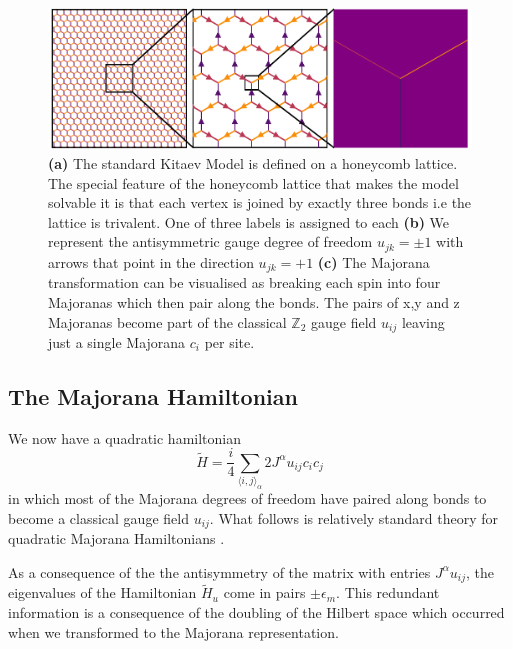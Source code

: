 \begin{figure}
\hypertarget{fig:intro_figure_template}{%
\centering
\includegraphics[width=1\textwidth,height=\textheight]{figure_code/amk_chapter/honeycomb_zoom/intro_figure_template.pdf}
\caption{\textbf{(a)} The standard Kitaev Model is defined on a honeycomb lattice. The special feature of the honeycomb lattice that makes the model solvable it is that each vertex is joined by exactly three bonds i.e the lattice is trivalent. One of three labels is assigned to each \textbf{(b)} We represent the antisymmetric gauge degree of freedom \(u_{jk} = \pm 1\) with arrows that point in the direction \(u_{jk} = +1\) \textbf{(c)} The Majorana transformation can be visualised as breaking each spin into four Majoranas which then pair along the bonds. The pairs of x,y and z Majoranas become part of the classical \(\mathbb{Z}_2\) gauge field \(u_{ij}\) leaving just a single Majorana \(c_i\) per site.}\label{fig:intro_figure_template}
}
\end{figure}

\hypertarget{the-majorana-hamiltonian}{%
\subsection{The Majorana Hamiltonian}\label{the-majorana-hamiltonian}}

We now have a quadratic hamiltonian \[ \tilde{H} =  \frac{i}{4} \sum_{\langle i,j\rangle_\alpha} 2J^{\alpha} u_{ij} c_i c_j\] in which most of the Majorana degrees of freedom have paired along bonds to become a classical gauge field \(u_{ij}\). What follows is relatively standard theory for quadratic Majorana Hamiltonians \textcite{BlaizotRipka1986}.

As a consequence of the the antisymmetry of the matrix with entries \(J^{\alpha} u_{ij}\), the eigenvalues of the Hamiltonian \(\tilde{H}_u\) come in pairs \(\pm \epsilon_m\). This redundant information is a consequence of the doubling of the Hilbert space which occurred when we transformed to the Majorana representation.

